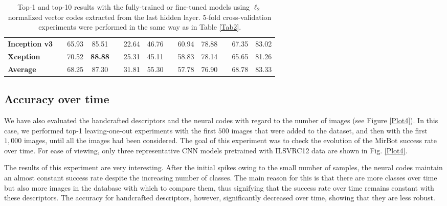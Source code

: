 \documentclass[final, twocolumn]{elsarticle}
\begin{document}
\begin{table*}
\begin{footnotesize}
\begin{tabular}{llccccccccccc}
\textbf{Inception v3} && 65.93                                     & 85.51                                    && 22.64              & 46.76             && 60.94                                        & 78.88                                        && 67.35                                      & 83.02                                      \\ 
\textbf{Xception}     && 70.52                                     & \textbf{88.88}                           && 25.31              & 45.11             && 58.83                                        & 78.14                                        && 65.65                                      & 81.26                                      \\ \hline
\textbf{Average}      && 68.25                                     & 87.30                                    && 31.81              & 55.30             && 57.78                                        & 76.90                                        && 68.78                                      & 83.33                                        \\ \hline
\end{tabular}
\end{footnotesize}
\caption{Top-1 and top-10 results with the fully-trained or fine-tuned models using $\ell_2$ normalized vector codes extracted from the last hidden layer. 5-fold cross-validation experiments were performed in the same way as in Table \ref{Tab2}.}
\label{tab:knn_from_dnn_train}
\end{table*}


\subsection{Accuracy over time}

We have also evaluated the handcrafted descriptors and the neural codes with regard to the number of images (see Figure \ref{Plot4}). In this case, we performed top-1 leaving-one-out experiments with the first $500$ images that were added to the dataset, and then with the first $1,000$ images, until all the images had been considered. The goal of this experiment was to check the evolution of the MirBot success rate over time. For ease of viewing, only three representative CNN models pretrained with ILSVRC12 data are shown in Fig. \ref{Plot4}. 

The results of this experiment are very interesting. After the initial spikes owing to the small number of samples, the neural codes maintain an almost constant success rate despite the increasing number of classes. The main reason for this is that there are more classes over time but also more images in the database with which to compare them, thus signifying that the success rate over time remains constant with these descriptors. The accuracy for handcrafted descriptors, however, significantly decreased over time, showing that they are less robust.
\end{document}
